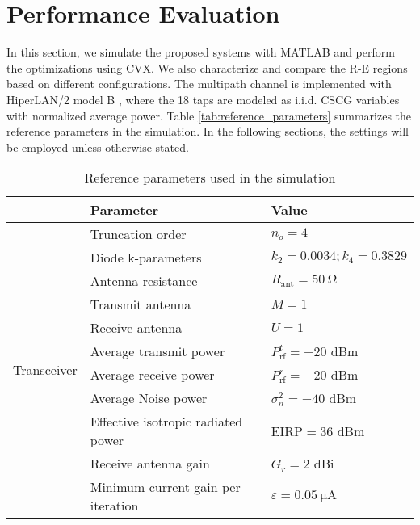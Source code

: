 \chapter{Performance Evaluation}
In this section, we simulate the proposed systems with MATLAB and perform the optimizations using CVX. We also characterize and compare the R-E regions based on different configurations. The multipath channel is implemented with HiperLAN/2 model B \cite{Medbo1998}, where the 18 taps are modeled as i.i.d. CSCG variables with normalized average power. Table \ref{tab:reference_parameters} summarizes the reference parameters in the simulation. In the following sections, the settings will be employed unless otherwise stated.

\begin{table}[h!]
\caption{Reference parameters used in the simulation}
\begin{tabular}{lll}
                              & Parameter                          & Value                                \\ \hline
\multirow{11}{*}{Transceiver} & Truncation order                   & ${n_o} = 4$                          \\
                              & Diode k-parameters                 & ${k_2} = 0.0034;{k_4} = 0.3829$      \\
                              & Antenna resistance                 & ${R_{{\text{ant}}}} = \SI{50}{\ohm}$ \\
                              & Transmit antenna                   & $M = 1$                              \\
                              & Receive antenna                    & $U = 1$                              \\
                              & Average transmit power             & $P_{{\text{rf}}}^t =  - 20$ dBm      \\
                              & Average receive power              & $P_{{\text{rf}}}^r =  - 20$ dBm      \\
                              & Average Noise power                & $\sigma _n^2 =  - 40$ dBm            \\
                              & Effective isotropic radiated power & $\text{EIRP} = 36$ dBm               \\
                              & Receive antenna gain               & ${G_r} = 2$ dBi                      \\
                              & Minimum current gain per iteration & $\varepsilon  = \SI{0.05}{\uA}$      \\ \hline

\end{tabular}
\end{table}
